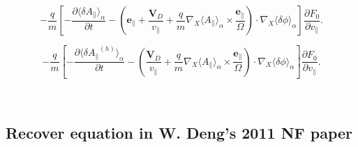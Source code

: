 \documentclass{llncs}
\begin{document}
\[ - \frac{q}{m} \left[ - \frac{{\partial \langle \delta A_{\parallel}} 
   \rangle_{\alpha}}{\partial t} - \left( \mathbf{e}_{\parallel} +
   \frac{\mathbf{V}_D}{v_{\parallel}} + \frac{q}{m} \nabla_X \langle
   A_{\parallel} \rangle_{\alpha} \times \frac{\mathbf{e}_{\parallel}}{\Omega}
   \right) \cdot \nabla_X \langle \delta \phi \rangle_{\alpha} \right]
   \frac{\partial F_0}{\partial v_{\parallel}} . \]

\[ - \frac{q}{m} \left[ - \frac{{\partial \langle \delta A_{\parallel}} ^{(h)}
   \rangle_{\alpha}}{\partial t} - \left( \frac{\mathbf{V}_D}{v_{\parallel}} +
   \frac{q}{m} \nabla_X \langle A_{\parallel} \rangle_{\alpha} \times
   \frac{\mathbf{e}_{\parallel}}{\Omega} \right) \cdot \nabla_X \langle \delta
   \phi \rangle_{\alpha} \right] \frac{\partial F_0}{\partial v_{\parallel}} .
\]


\

\subsection{Recover equation in W. Deng's 2011 NF paper}
\end{document}
